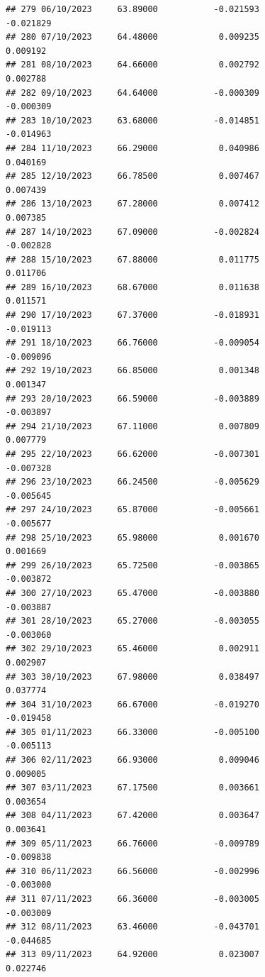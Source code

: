 \documentclass[
]{article}
\begin{document}
\begin{verbatim}
## 279 06/10/2023     63.89000           -0.021593               -0.021829
## 280 07/10/2023     64.48000            0.009235                0.009192
## 281 08/10/2023     64.66000            0.002792                0.002788
## 282 09/10/2023     64.64000           -0.000309               -0.000309
## 283 10/10/2023     63.68000           -0.014851               -0.014963
## 284 11/10/2023     66.29000            0.040986                0.040169
## 285 12/10/2023     66.78500            0.007467                0.007439
## 286 13/10/2023     67.28000            0.007412                0.007385
## 287 14/10/2023     67.09000           -0.002824               -0.002828
## 288 15/10/2023     67.88000            0.011775                0.011706
## 289 16/10/2023     68.67000            0.011638                0.011571
## 290 17/10/2023     67.37000           -0.018931               -0.019113
## 291 18/10/2023     66.76000           -0.009054               -0.009096
## 292 19/10/2023     66.85000            0.001348                0.001347
## 293 20/10/2023     66.59000           -0.003889               -0.003897
## 294 21/10/2023     67.11000            0.007809                0.007779
## 295 22/10/2023     66.62000           -0.007301               -0.007328
## 296 23/10/2023     66.24500           -0.005629               -0.005645
## 297 24/10/2023     65.87000           -0.005661               -0.005677
## 298 25/10/2023     65.98000            0.001670                0.001669
## 299 26/10/2023     65.72500           -0.003865               -0.003872
## 300 27/10/2023     65.47000           -0.003880               -0.003887
## 301 28/10/2023     65.27000           -0.003055               -0.003060
## 302 29/10/2023     65.46000            0.002911                0.002907
## 303 30/10/2023     67.98000            0.038497                0.037774
## 304 31/10/2023     66.67000           -0.019270               -0.019458
## 305 01/11/2023     66.33000           -0.005100               -0.005113
## 306 02/11/2023     66.93000            0.009046                0.009005
## 307 03/11/2023     67.17500            0.003661                0.003654
## 308 04/11/2023     67.42000            0.003647                0.003641
## 309 05/11/2023     66.76000           -0.009789               -0.009838
## 310 06/11/2023     66.56000           -0.002996               -0.003000
## 311 07/11/2023     66.36000           -0.003005               -0.003009
## 312 08/11/2023     63.46000           -0.043701               -0.044685
## 313 09/11/2023     64.92000            0.023007                0.022746

\end{verbatim}
\end{document}
